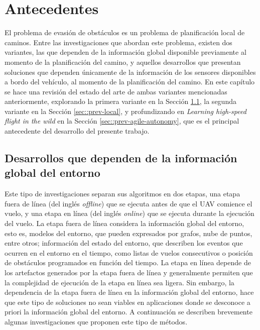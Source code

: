 \chapter{Antecedentes}
\label{capitulo4}


El problema de evasión de obstáculos es un problema de planificación local de caminos. Entre las investigaciones que abordan este problema, existen dos variantes, las que dependen de la información global disponible previamente al momento de la planificación del camino, y aquellos desarrollos que presentan soluciones que dependen únicamente de la información de los sensores disponibles a bordo del vehículo, al momento de la planificación del camino. En este capítulo se hace una revisión del estado del arte de ambas variantes mencionadas anteriormente, explorando la primera variante en la Sección \ref{sec::prev-global}, la segunda variante en la Sección \ref{sec::prev-local}, y profundizando en \textit{Learning high-speed flight in the wild} en la Sección \ref{sec::prev-agile-autonomy}, que es el principal antecedente del desarrollo del presente trabajo.

\section{Desarrollos que dependen de la información global del entorno}
\label{sec::prev-global}

Este tipo de investigaciones separan sus algoritmos en dos etapas, una etapa fuera de línea (del inglés \textit{offline}) que se ejecuta antes de que el UAV comience el vuelo, y una etapa en línea (del inglés \textit{online}) que se ejecuta durante la ejecución del vuelo. La etapa fuera de línea considera la información global del entorno, esto es, modelos del entorno, que pueden expresados por grafos, nube de puntos, entre otros; información del estado del entorno, que describen los eventos que ocurren en el entorno en el tiempo, como listas de vuelos consecutivos o posición de obstáculos programados en función del tiempo. La etapa en línea depende de los artefactos generados por la etapa fuera de línea y generalmente permiten que la complejidad de ejecución de la etapa en línea sea ligera. Sin embargo, la dependencia de la etapa fuera de línea en la información global del entorno, hace que este tipo de soluciones no sean viables en aplicaciones donde se desconoce a priori la información global del entorno. A continuación se describen brevemente algunas investigaciones que proponen este tipo de métodos.

